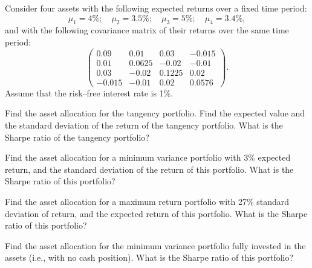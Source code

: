 \begin{exercises}
\item Consider four assets with the following expected returns over a fixed
time period:
\[
\mu_1 = 4\%;\quad \mu_2 = 3.5\%;\quad \mu_3 = 5\%;\quad \mu_4 = 3.4\%,
\]
and with the following covariance matrix of their returns over the same time
period:
\[
\begin{pmatrix}
0.09 & 0.01 & 0.03 & -0.015\\
0.01 & 0.0625 & -0.02 & -0.01\\
0.03 & -0.02 & 0.1225 & 0.02\\
-0.015 & -0.01 & 0.02 & 0.0576
\end{pmatrix}.
\]
Assume that the risk--free interest rate is 1\%.
\begin{subparts}
\item Find the asset allocation for the tangency portfolio. Find the
expected value and the standard deviation of the return of the tangency
portfolio. What is the Sharpe ratio of the tangency portfolio?
\item Find the asset allocation for a minimum variance portfolio with 3\%
expected return, and the standard deviation of the return of this portfolio.
What is the Sharpe ratio of this portfolio?
\item Find the asset allocation for a maximum return portfolio with 27\%
standard deviation of return, and the expected return of this portfolio.
What is the Sharpe ratio of this portfolio?
\item Find the asset allocation for the minimum variance portfolio fully
invested in the assets (i.e., with no cash position). What is the Sharpe
ratio of this portfolio?
\end{subparts}


\end{exercises}
